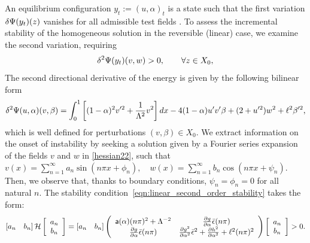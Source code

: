 An equilibrium configuration $y_t:=(u,\alpha)_t$ is a state such that the first variation $\delta \Psi(y_t)(z)$ vanishes for all admissible test fields . 
To assess the incremental stability of the homogeneous solution in the reversible (linear) case, we examine the  second variation, requiring
\begin{equation}
\delta^2 \Psi(y_t)(v,w)>0, \qquad  \forall z\in X_0,
\label{eqn:linear_second_order_stability}
\end{equation} 
{The second directional derivative of the energy is given by the following bilinear form}
\begin{equation}
\delta^2 \Psi(u,\alpha)(v,\beta)=\int_0^1 \left[(1-\alpha)^2v'^2 
+\frac{1}{\Lambda^2} v^2 \right]dx
- 4(1-\alpha)u' v'\beta+(2+ u'^2)w^2+\ell^2\beta'^2, 
\label{hessian22}
\end{equation}
which is well defined for perturbations $(v, \beta)\in X_0$.
{We} extract information on the onset of instability by seeking a solution given by a Fourier series expansion of the fields $v$ and $w$ in \eqref{hessian22}, such that $v(x)=\sum_{n=1}^{\infty} a_{n} \sin \left(n \pi x+\phi_{n}\right), \quad w(x)=\sum_{n=1}^{\infty} b_{n} \cos \left(n \pi x+\psi_{n}\right)$. Then, we observe that, thanks to boundary conditions, $\psi_{n}=\phi_{n}=0$ for all natural $n$. The stability condition~\eqref{eqn:linear_second_order_stability}  takes the form:
\begin{align}\left[ a_n \quad b_n \right] \mathcal{H} \left[ \begin{array}{c} a_n \\ b_n \end{array} \right]=\left[ a_n \quad b_n \right]\left(
\begin{array}{cc}
\mathsf{a}(\alpha)(n\pi)^2+\Lambda^{-2}  & \frac{\partial g}{\partial \alpha}\bar\epsilon(n\pi)  \\
\frac{\partial g}{\partial \alpha}\bar\epsilon(n\pi)  &   \frac{\partial g^2}{\partial \alpha^2}\bar\epsilon^2+ \frac{\partial h^2}{\partial \alpha^2}+\ell^2(n\pi)^2  \\
\end{array}
\right)\left[ \begin{array}{c} a_n \\ b_n \end{array} \right]>0.\label{hessian1}\end{align}
